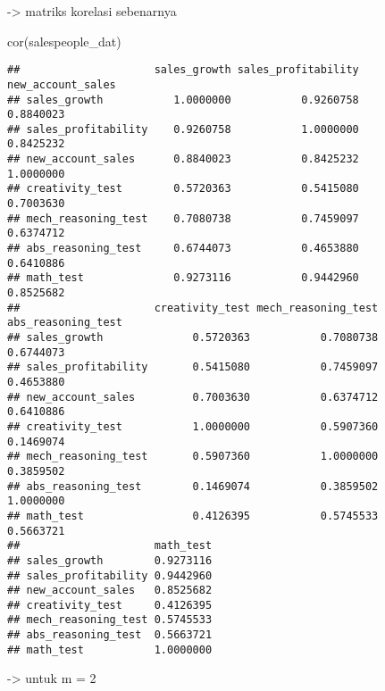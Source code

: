 \documentclass[
]{article}
\newenvironment{Shaded}{\begin{snugshade}}{\end{snugshade}}
\newcommand{\DecValTok}[1]{\textcolor[rgb]{0.00,0.00,0.81}{#1}}
\newcommand{\FunctionTok}[1]{\textcolor[rgb]{0.00,0.00,0.00}{#1}}
\newcommand{\NormalTok}[1]{#1}
\newcommand{\SpecialCharTok}[1]{\textcolor[rgb]{0.00,0.00,0.00}{#1}}
\begin{document}
-\textgreater{} matriks korelasi sebenarnya

\begin{Shaded}
\begin{Highlighting}[]
\FunctionTok{cor}\NormalTok{(salespeople\_dat)}
\end{Highlighting}
\end{Shaded}

\begin{verbatim}
##                     sales_growth sales_profitability new_account_sales
## sales_growth           1.0000000           0.9260758         0.8840023
## sales_profitability    0.9260758           1.0000000         0.8425232
## new_account_sales      0.8840023           0.8425232         1.0000000
## creativity_test        0.5720363           0.5415080         0.7003630
## mech_reasoning_test    0.7080738           0.7459097         0.6374712
## abs_reasoning_test     0.6744073           0.4653880         0.6410886
## math_test              0.9273116           0.9442960         0.8525682
##                     creativity_test mech_reasoning_test abs_reasoning_test
## sales_growth              0.5720363           0.7080738          0.6744073
## sales_profitability       0.5415080           0.7459097          0.4653880
## new_account_sales         0.7003630           0.6374712          0.6410886
## creativity_test           1.0000000           0.5907360          0.1469074
## mech_reasoning_test       0.5907360           1.0000000          0.3859502
## abs_reasoning_test        0.1469074           0.3859502          1.0000000
## math_test                 0.4126395           0.5745533          0.5663721
##                     math_test
## sales_growth        0.9273116
## sales_profitability 0.9442960
## new_account_sales   0.8525682
## creativity_test     0.4126395
## mech_reasoning_test 0.5745533
## abs_reasoning_test  0.5663721
## math_test           1.0000000
\end{verbatim}

-\textgreater{} untuk m = 2

\begin{Shaded}
\end{Shaded}
\end{document}
